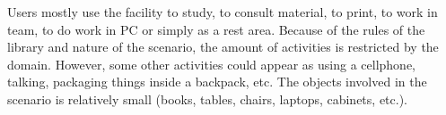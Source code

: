 Users mostly use the facility to study, to consult material, to print, to work in team, to do work in PC or simply as a rest area.
Because of the rules of the library and nature of the scenario, the amount of activities is restricted by the domain.
However, some other activities could appear as using a cellphone, talking, packaging things inside a backpack, etc.
The objects involved in the scenario is relatively small (books, tables, chairs, laptops, cabinets, etc.).






